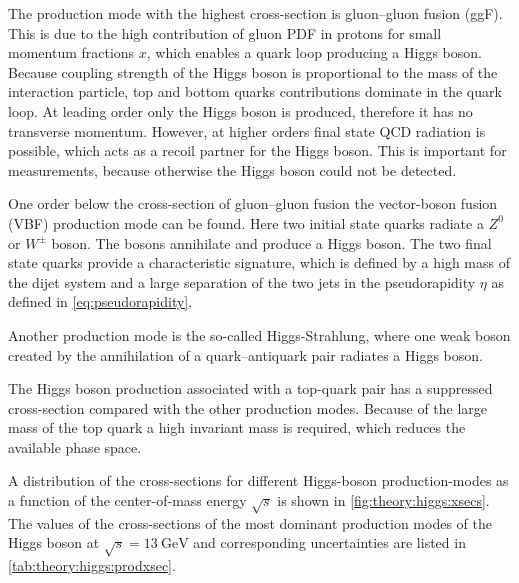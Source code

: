 The production mode with the highest cross-section is gluon--gluon fusion (ggF).
This is due to the high contribution of gluon PDF in protons for small momentum fractions $x$, which enables
a quark loop producing a Higgs boson. Because coupling strength of the Higgs boson is proportional to the mass of the
interaction particle, top and bottom quarks contributions dominate in the quark loop.
At leading order only the Higgs boson is produced, therefore it has no transverse momentum.
However, at higher orders final state QCD radiation is possible, which acts as a recoil partner for the Higgs boson.
This is important for measurements, because otherwise the Higgs boson could not be detected.

One order below the cross-section of gluon--gluon fusion the vector-boson fusion (VBF) production mode can be found.
Here two initial state quarks radiate a $Z^0$ or $W^\pm$ boson.
The bosons annihilate and produce a Higgs boson.
The two final state quarks provide a characteristic signature, which is defined by a high mass of the dijet system
and a large separation of the two jets in the pseudorapidity $\eta$ as defined in \cref{eq:pseudorapidity}.

Another production mode is the so-called Higgs-Strahlung, where one weak boson created by the annihilation of
a quark--antiquark pair radiates a Higgs boson.

The Higgs boson production associated with a top-quark pair has a suppressed cross-section compared with the
other production modes.
Because of the large mass of the top quark a high invariant mass is required, which reduces the available phase space.

A distribution of the cross-sections for different Higgs-boson production-modes as a function of the center-of-mass
energy $\sqrt{s}$ is shown in \cref{fig:theory:higgs:xsecs}.
The values of the cross-sections of the most dominant production modes of the Higgs boson at $\sqrt{s} = \SI{13}{\GeV}$
and corresponding uncertainties are listed in \cref{tab:theory:higgs:prodxsec}.

